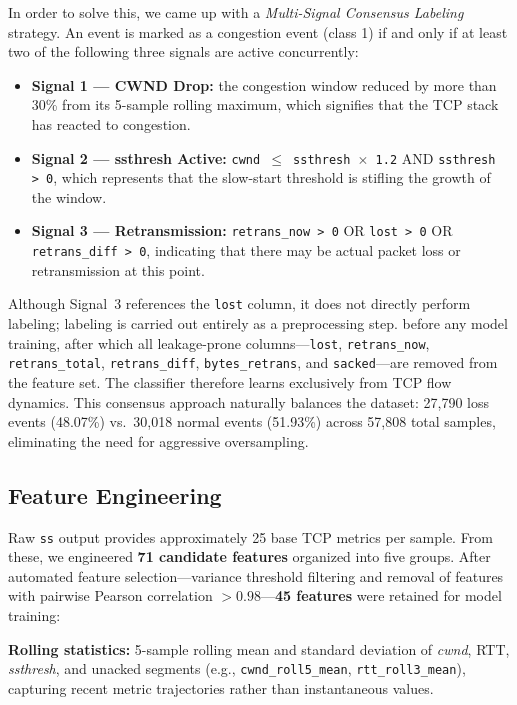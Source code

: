 \documentclass[journal]{IEEEtran}
\begin{document}
In order to solve this, we came up with a \emph{Multi-Signal Consensus Labeling} strategy. An event is marked as a congestion event (class 1) if and only if at least two of the following three signals are active concurrently:
\begin{itemize}
  \item \textbf{Signal 1 --- CWND Drop:} the congestion window reduced by more than 30\% from its 5-sample rolling maximum, which signifies that the TCP stack has reacted to congestion.
  \item \textbf{Signal 2 --- ssthresh Active:} \texttt{cwnd\,$\leq$\,ssthresh\,$\times$\,1.2} AND \texttt{ssthresh\,>\,0}, which represents that the slow-start threshold is stifling the growth of the window.
  \item \textbf{Signal 3 --- Retransmission:} \texttt{retrans\_now\,>\,0} OR \texttt{lost\,>\,0} OR \texttt{retrans\_diff\,>\,0}, indicating that there may be actual packet loss or retransmission at this point.
\end{itemize}

Although Signal~3 references the \texttt{lost} column, it does not directly perform labeling; labeling is carried out entirely as a preprocessing step. before any model training, after which all leakage-prone columns---\texttt{lost}, \texttt{retrans\_now}, \texttt{retrans\_total}, \texttt{retrans\_diff}, \texttt{bytes\_retrans}, and \texttt{sacked}---are removed from the feature set. The classifier therefore learns exclusively from TCP flow dynamics. This consensus approach naturally balances the dataset: 27,790 loss events (48.07\%) vs.\ 30,018 normal events (51.93\%) across 57,808 total samples, eliminating the need for aggressive oversampling.

\subsection{Feature Engineering}
\label{sec:features}

Raw \texttt{ss} output provides approximately 25 base TCP metrics per sample. From these, we engineered \textbf{71 candidate features} organized into five groups. After automated feature selection---variance threshold filtering and removal of features with pairwise Pearson correlation $>0.98$---\textbf{45 features} were retained for model training:

\textbf{Rolling statistics:} 5-sample rolling mean and standard deviation of \emph{cwnd}, RTT, \emph{ssthresh}, and unacked segments (e.g., \texttt{cwnd\_roll5\_mean}, \texttt{rtt\_roll3\_mean}), capturing recent metric trajectories rather than instantaneous values.
\end{document}
